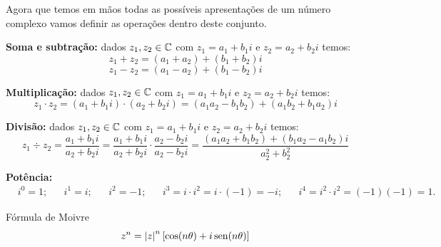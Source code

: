  Agora que temos em mãos todas as possíveis apresentações de um número complexo vamos definir as operações dentro deste conjunto.

 \textbf{Soma e subtração:} dados $z_1, z_2 \in \mathbb{C}$ com $z_1= a_1 + b_1i$ e $z_2= a_2 + b_2i$ temos:
 \[z_1 + z_2= (a_1 + a_2) + (b_1 + b_2)i \]
 \[z_1 - z_2= (a_1 - a_2) + (b_1 - b_2)i \]

 \textbf{Multiplicação:} dados $z_1, z_2 \in \mathbb{C}$ com $z_1= a_1 + b_1i$ e $z_2= a_2 + b_2i$ temos:
 \[z_1 \cdot z_2= (a_1 + b_1i) \cdot (a_2 + b_2i)= (a_1a_2 - b_1b_2) + (a_1b_2 + b_1a_2)i \]

 \textbf{Divisão:} dados $z_1, z_2 \in \mathbb{C}$ com $z_1= a_1 + b_1i$ e $z_2= a_2 + b_2i$ temos:
 \[z_1 \div z_2= \frac{a_1 + b_1i}{a_2 + b_2i}= \frac{a_1 + b_1i}{a_2 + b_2i} \cdot \frac{a_2 - b_2i}{a_2 - b_2i} = \frac{(a_1a_2 + b_1b_2) + (b_1a_2 - a_1b_2)i}{a_2^2 + b_2^2} \]

 \textbf{Potência:}
 \begin{align*}
 & i^0= 1 ;& & i^1= i; & & i^2= -1; & & i^3= i \cdot i^2= i \cdot (-1)= -i; & & i^4= i^2 \cdot i^2= (-1)(-1)= 1 .&
 \end{align*}

 Fórmula de Moivre
 \begin{equation}
  z^n= \left|z\right|^n[\cos(n \theta) + i \operatorname{sen}(n \theta)]
 \end{equation}
